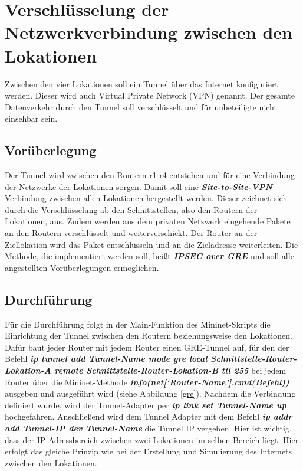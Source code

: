 \documentclass[fontsize=12pt,paper=a4,open=any,parskip=half,
  twoside=false,toc=listof,toc=bibliography,fleqn,leqno,
  captions=nooneline,captions=tableabove,british]{scrbook}
\begin{document}
\section{Verschlüsselung der Netzwerkverbindung zwischen den Lokationen}
Zwischen den vier Lokationen soll ein Tunnel über das Internet konfiguriert werden. Dieser wird auch Virtual Private Network (VPN) genannt. Der gesamte Datenverkehr durch den Tunnel soll verschlüsselt und für unbeteiligte nicht einsehbar sein.

\subsection{Vorüberlegung}
Der Tunnel wird zwischen den Routern r1-r4 entstehen und für eine Verbindung der Netzwerke der Lokationen sorgen. Damit soll eine \textit{\textbf{Site-to-Site-VPN}} Verbindung zwischen allen Lokationen hergestellt werden. Dieser zeichnet sich durch die Verschlüsselung ab den Schnittstellen, also den Routern der Lokationen, aus. Zudem werden aus dem privaten Netzwerk eingehende Pakete an den Routern verschlüsselt und weiterverschickt. Der Router an der Ziellokation wird das Paket entschlüsseln und an die Zieladresse weiterleiten. Die Methode, die implementiert werden soll, heißt \textit{\textbf{IPSEC over GRE}} und soll alle angestellten Vorüberlegungen ermöglichen.

\subsection{Durchführung}
Für die Durchführung folgt in der Main-Funktion des Mininet-Skripts die Einrichtung der Tunnel zwischen den Routern beziehungsweise den Lokationen. Dafür baut jeder Router mit jedem Router einen GRE-Tunnel auf, für den der Befehl \textit{\textbf{ip tunnel add Tunnel-Name mode gre local Schnittstelle\hyp{}Router\hyp{}Lokation\hyp{}A remote Schnittstelle\hyp{}Router\hyp{}Lokation\hyp{}B ttl 255}} bei jedem Router über die Mininet-Methode \textit{\textbf{info(net[‘Router\hyp{}Name'].cmd(Befehl))}} ausgeben und ausgeführt wird (siehe Abbildung \ref{gre}). Nachdem die Verbindung definiert wurde, wird der Tunnel-Adapter per \textit{\textbf{ip link set Tunnel-Name up}} hochgefahren. Anschließend wird dem Tunnel Adapter mit dem Befehl \textit{\textbf{ip addr add Tunnel-IP dev Tunnel-Name}} die Tunnel IP vergeben. Hier ist wichtig, dass der IP-Adressbereich zwischen zwei Lokationen im selben Bereich liegt. Hier erfolgt das gleiche Prinzip wie bei der Erstellung und Simulierung des Internets zwischen den Lokationen.
\end{document}
